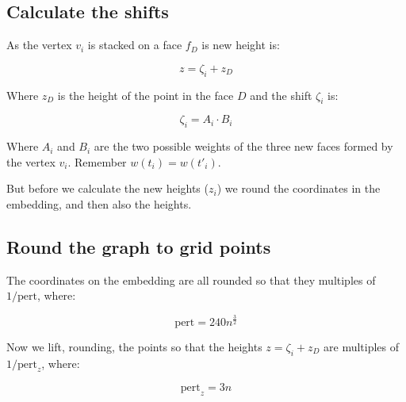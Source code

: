 \documentclass[10pt,a4paper]{article}
\begin{document}
\subsection{Calculate the shifts} 

As the vertex $v_i$ is stacked on a face $f_D$ is new height is:

$$z= \zeta_i + z_D $$

Where $z_D$ is the height of the point in the face $D$ and the shift $\zeta_i$ is:

$$\zeta_i = A_i\cdot B_i$$

Where  $ A_i$ and $B_i$ are the two possible weights of the three new faces formed by the vertex $v_i$. Remember $w(t_i)= w(t'_i) $.

But before we calculate the new heights ($z_i$) we round the coordinates in the embedding, and then also the heights.

\subsection{Round the graph to grid points}

The coordinates on the embedding are all rounded so that they multiples of $1/\text{pert}$, where:

$$\text{pert}=240n^{\frac{3}{2}}$$

Now we lift, rounding, the points so that the heights $z= \zeta_i + z_D $ are multiples of $1/\text{pert}_z$, where: 

$$\text{pert}_z=3n$$ 
\end{document}
